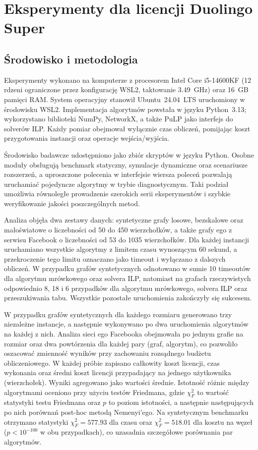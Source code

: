 \chapter{Eksperymenty dla licencji Duolingo Super}
\label{chap:experiments}
\section{Środowisko i metodologia}

Eksperymenty wykonano na komputerze z procesorem Intel Core i5-14600KF (12 rdzeni ograniczone przez konfigurację WSL2, taktowanie 3.49~GHz) oraz 16~GB pamięci RAM. System operacyjny stanowił Ubuntu~24.04~LTS uruchomiony w środowisku WSL2. Implementacja algorytmów powstała w języku Python~3.13; wykorzystano biblioteki NumPy, NetworkX, a także PuLP jako interfejs do solverów ILP. Każdy pomiar obejmował wyłącznie czas obliczeń, pomijając koszt przygotowania instancji oraz operacje wejścia/wyjścia.

Środowisko badawcze udostępniono jako zbiór skryptów w języku Python. Osobne moduły obsługują benchmark statyczny, symulacje dynamiczne oraz scenariusze rozszerzeń, a uproszczone polecenia w interfejsie wiersza poleceń pozwalają uruchamiać pojedyncze algorytmy w trybie diagnostycznym. Taki podział umożliwia równoległe prowadzenie szerokich serii eksperymentów i szybkie weryfikowanie jakości poszczególnych metod.

Analiza objęła dwa zestawy danych: syntetyczne grafy losowe, bezskalowe oraz małoświatowe o liczebności od 50 do 450 wierzchołków, a także grafy ego z serwisu Facebook o liczebności od 53 do 1035 wierzchołków. Dla każdej instancji uruchamiano wszystkie algorytmy z limitem czasu wynoszącym 60 sekund, a przekroczenie tego limitu oznaczano jako timeout i wyłączano z dalszych obliczeń. W przypadku grafów syntetycznych odnotowano w sumie 10 timeoutów dla algorytmu mrówkowego oraz solvera ILP, natomiast na grafach rzeczywistych odpowiednio 8, 18 i 6 przypadków dla algorytmu mrówkowego, solvera ILP oraz przeszukiwania tabu. Wszystkie pozostałe uruchomienia zakończyły się sukcesem.

W przypadku grafów syntetycznych dla każdego rozmiaru generowano trzy niezależne instancje, a następnie wykonywano po dwa uruchomienia algorytmów na każdej z nich. Analiza sieci ego Facebooka obejmowała po jednym grafie na rozmiar oraz dwa powtórzenia dla każdej pary (graf, algorytm), co pozwoliło oszacować zmienność wyników przy zachowaniu rozsądnego budżetu obliczeniowego. W każdej próbie zapisano całkowity koszt licencji, czas wykonania oraz średni koszt licencji przypadający na jednego użytkownika (wierzchołek). Wyniki agregowano jako wartości średnie. Istotność różnic między algorytmami oceniono przy użyciu testów Friedmana, gdzie $\chi^2_F$ to wartość statystyki testu Friedmana oraz $p$ to poziom istotności, a następnie następujących po nich porównań post-hoc metodą Nemenyi'ego. Na syntetycznym benchmarku otrzymano statystyki $\chi^2_F = 577.93$ dla czasu oraz $\chi^2_F = 518.01$ dla kosztu na węzeł ($p < 10^{-100}$ w obu przypadkach), co uzasadnia szczegółowe porównania par algorytmów.

